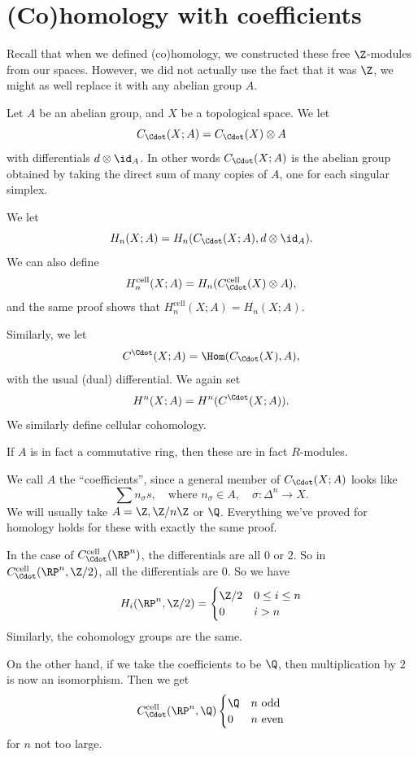 \documentclass[a4paper]{article}
\theoremstyle{definition}
\begin{document}
\section{(Co)homology with coefficients}
Recall that when we defined (co)homology, we constructed these free $\Z$-modules from our spaces. However, we did not actually use the fact that it was $\Z$, we might as well replace it with any abelian group $A$.

\begin{defi}
  Let $A$ be an abelian group, and $X$ be a topological space. We let
  \[
    C_{\Cdot}(X; A) = C_\Cdot(X) \otimes A
  \]
  with differentials $d \otimes \id_A$. In other words $C_{\Cdot}(X; A)$ is the abelian group obtained by taking the direct sum of many copies of $A$, one for each singular simplex.

  We let
  \[
    H_n(X; A) = H_n(C_{\Cdot}(X; A), d \otimes \id_A).
  \]
  We can also define
  \[
    H_n^{\mathrm{cell}}(X; A) = H_n(C_{\Cdot}^{\mathrm{cell}}(X) \otimes A),
  \]
  and the same proof shows that $H_n^{\mathrm{cell}}(X; A) = H_n(X; A)$.

  Similarly, we let
  \[
    C^{\Cdot}(X; A) = \Hom(C_{\Cdot}(X), A),
  \]
  with the usual (dual) differential. We again set
  \[
    H^n(X; A) = H^n(C^\Cdot(X; A)).
  \]
  We similarly define cellular cohomology.

  If $A$ is in fact a commutative ring, then these are in fact $R$-modules.
\end{defi}
We call $A$ the ``coefficients'', since a general member of $C_{\Cdot}(X; A)$ looks like
\[
  \sum n_\sigma s,\quad \text{where } n_\sigma \in A,\quad \sigma: \Delta^n \to X.
\]
We will usually take $A = \Z, \Z/n\Z$ or $\Q$. Everything we've proved for homology holds for these with exactly the same proof.

\begin{eg}
  In the case of $C_{\Cdot}^{\mathrm{cell}}(\RP^n)$, the differentials are all $0$ or $2$. So in $C_\Cdot^{\mathrm{cell}}(\RP^n, \Z/2)$, all the differentials are $0$. So we have
  \[
    H_i(\RP^n, \Z/2) =
    \begin{cases}
      \Z/2 & 0 \leq i \leq n\\
      0 & i > n
    \end{cases}
  \]
  Similarly, the cohomology groups are the same.

  On the other hand, if we take the coefficients to be $\Q$, then multiplication by $2$ is now an isomorphism. Then we get
  \[
    C_{\Cdot}^\mathrm{cell}(\RP^n, \Q)
    \begin{cases}
      \Q & n \text{ odd}\\
      0 & n\text{ even}
    \end{cases}
  \]
  for $n$ not too large.
\end{eg}
\end{document}
